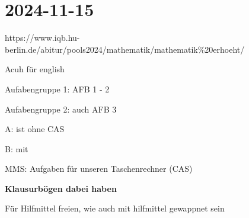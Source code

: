 \section{2024-11-15}

\startframedtipp
https://www.iqb.hu-berlin.de/abitur/pools2024/mathematik/mathematik\%20erhoeht/

Acuh für english

\startitemize[packed]
\item Aufabengruppe 1: AFB 1 - 2
\item Aufabengruppe 2: auch AFB 3
\item A: ist ohne CAS
\item B: mit
\item MMS: Aufgaben für unseren Taschenrechner (CAS)
\item {\bf Klausurbögen dabei haben}
\item Für Hilfmittel freien, wie auch mit hilfmittel gewappnet sein
\stopitemize

\stopframedtipp
